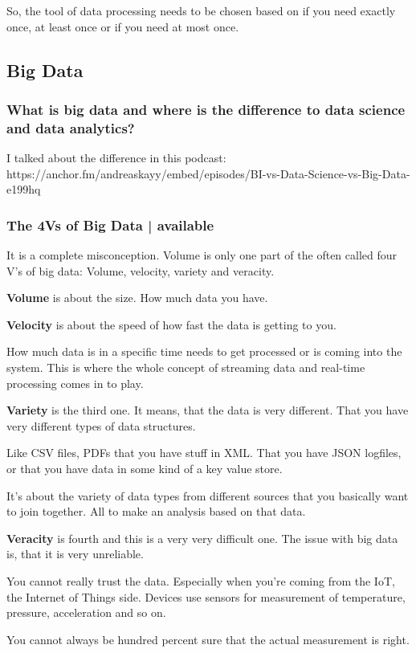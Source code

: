 \documentclass[12pt]{scrartcl} %
\begin{document}
So, the tool of data processing needs to be chosen based on if you need exactly once, at least once or if you need at most once.

\subsection{Big Data}
\subsubsection{What is big data and where is the difference to data science and data analytics?}
I talked about the difference in this podcast: https://anchor.fm/andreaskayy/embed/episodes/BI-vs-Data-Science-vs-Big-Data-e199hq

\subsubsection{The 4Vs of Big Data | available}

It is a complete misconception. Volume is only one part of the often called four V’s of big data: Volume, velocity, variety and veracity.

\textbf{Volume} is about the size. How much data you have.

\textbf{Velocity} is about the speed of how fast the data is getting to you.

How much data is in a specific time needs to get processed or is coming into the system. This is where the whole concept of streaming data and real-time processing comes in to play.

\textbf{Variety} is the third one. It means, that the data is very different. That you have very different types of data structures.

Like CSV files, PDFs that you have stuff in XML. That you have JSON logfiles, or that you have data in some kind of a key value store.

It’s about the variety of data types from different sources that you basically want to join together. All to make an analysis based on that data.

\textbf{Veracity} is fourth and this is a very very difficult one. The issue with big data is, that it is very unreliable.

You cannot really trust the data. Especially when you’re coming from the IoT, the Internet of Things side. Devices use sensors for measurement of temperature, pressure, acceleration and so on.

You cannot always be hundred percent sure that the actual measurement is right.
\end{document}
